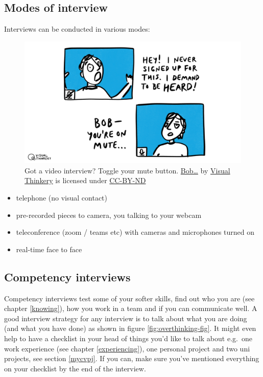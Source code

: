 \documentclass[
]{book}
\providecommand{\tightlist}{%
  \setlength{\itemsep}{0pt}\setlength{\parskip}{0pt}}
\begin{document}
\hypertarget{mode}{%
\subsection{Modes of interview}\label{mode}}

Interviews can be conducted in various modes:

\begin{figure}

{\centering \includegraphics[width=1\linewidth]{images/bob-youre-on-mute} 

}

\caption{Got a video interview? Toggle your mute button. \href{https://bryanmmathers.com/bob/}{Bob\ldots{}} by \href{https://visualthinkery.com/}{Visual Thinkery} is licensed under \href{https://creativecommons.org/licenses/by-nd/4.0/}{CC-BY-ND}}\label{fig:bobonmute-fig}
\end{figure}



\begin{itemize}
\tightlist
\item
  telephone (no visual contact)
\item
  pre-recorded pieces to camera, you talking to your webcam
\item
  teleconference (zoom / teams etc) with cameras and microphones turned on
\item
  real-time face to face
\end{itemize}

\hypertarget{hrinterview}{%
\subsection{Competency interviews}\label{hrinterview}}

Competency interviews test some of your softer skills, find out who you are (see chapter \ref{knowing}), how you work in a team and if you can communicate well. A good interview strategy for any interview is to talk about what you are doing (and what you have done) as shown in figure \ref{fig:overthinking-fig}. It might even help to have a checklist in your head of things you'd like to talk about e.g.~one work experience (see chapter \ref{experiencing}), one personal project and two uni projects, see section \ref{mycvpj}. If you can, make sure you've mentioned everything on your checklist by the end of the interview.
\end{document}
